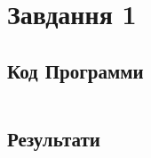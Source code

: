 \section{Завдання 1}
\label{sec:task1}

\subsection{Код Программи}
\label{subsec:task1_code}
\inputminted{python}{../src/task1.py}

\subsection{Результати}
\label{subsec:task1_results}
